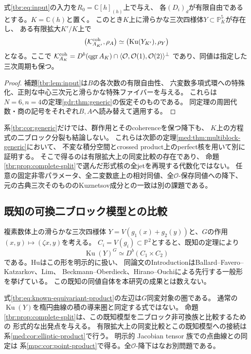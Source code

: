 \begin{corollary}[二ブロック一変数族への一般点復元の適用]
\label{tbr:cor:generic}
式\eqref{tbr:eq:input}の入力を$R_0=\mathbb C[h]_{(h)}$上で与え、
各$(D_i)_d$が有限自由であるとする。$K=\mathbb C(h)$と置く。
このとき$K$上に滑らかな三次四様体$Y\subset\mathbb P^5_K$が存在し、
ある有限拡大$K'/K$上で
\[
 \bigl(\mathcal K^{\rm coh}_{A_{K'}},\rho_A\bigr)
 \simeq\bigl(\operatorname{Ku}(Y_{K'}),\rho_Y\bigr)
\]
となる。ここで
$\mathcal K^{\rm coh}_{A_K}=D^b(\operatorname{qgr}A_K)
\cap\langle\mathcal O,\mathcal O(1),\mathcal O(2)\rangle^\perp$
であり、同値は指定した三次周期も保つ。
\end{corollary}
\begin{proof}
補題\ref{tbr:lem:input}は$B$の各次数の有限自由性、
六変数多項式環への特殊化、正則な中心三次元と滑らかな特殊ファイバーを与える。
これらは$N=6,n=4$の定理\ref{gdr:thm:generic}の仮定そのものである。
同定理の周囲代数・商の記号をそれぞれ$B,A$へ読み替えて適用する。
\end{proof}

系\ref{tbr:cor:generic}だけでは、群作用とそのcoherenceを保つ降下も、
$K$上の方程式の二ブロック分裂も結論しない。
これらは次節の定理\ref{med:thm:multiblock-generic}において、
不変な積分空間とcrossed product上のperfect核を用いて別に証明する。
そこで得るのは有限拡大上の同変比較の存在であり、
命題\ref{tbr:prop:complete-split}で選んだ形式核の全jetを再現する代数化ではない。
任意の固定非零パラメータ、全二変数底上の相対同値、全$\mathcal O$-保存同値への降下、
元の古典三次そのもののKuznetsov成分との一致は別の課題である。

\subsection{既知の可換二ブロック模型との比較}

複素数体上の滑らかな三次四様体
$Y=V(g_1(x)+g_2(y))$と、$G$の作用$(x,y)\mapsto(\zeta x,y)$を考える。
$C_i=V(g_i)\subset\mathbb P^2$とすると、既知の定理により
\begin{equation}\label{tbr:eq:known-equivariant-product}
 \operatorname{Ku}(Y)^G\simeq D^b(C_1\times C_2)
\end{equation}
である。Hu\cite[Theorems~0.1, 5.8]{TBHu}はこの形を明示的に扱い、
同論文のIntroductionはBallard--Favero--Katzarkov、Lim、
Beckmann--Oberdieck、Hirano--Ouchiによる先行する一般形を挙げている。
この既知の同値自体を本研究の成果とは数えない。

式\eqref{tbr:eq:known-equivariant-product}の左辺は$G$同変対象の圏である。
通常の$\operatorname{Ku}(Y)$を楕円曲線の積の導来圏と同定する式ではない。
命題\ref{tbr:prop:complete-split}は、この既知模型を二ブロック非可換族と比較するための
形式的な出発点を与える。
有限拡大上の同変比較とこの既知模型への接続は系\ref{med:cor:elliptic-product}で行う。
明示的 Jacobian tensor 族での点曲線との同定は
系\ref{mpc:cor:point-product}で得る。全$\mathcal O$-降下はなお別問題である。
